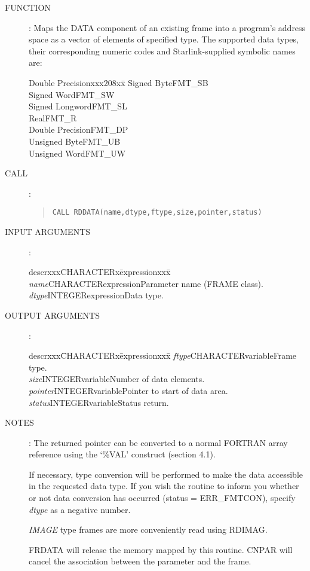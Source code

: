 \begin{description}
\item [FUNCTION]:
Maps the DATA component of an existing frame into a program's address space
as a vector of elements of specified type.
The supported data types, their corresponding numeric codes and
Starlink-supplied symbolic names are:
\begin{center}
\begin{tabbing}
Double Precisionxxx\=208xx\=\kill
Signed Byte\>FMT\_SB\\
Signed Word\>FMT\_SW\\
Signed Longword\>FMT\_SL\\
Real\>FMT\_R\\
Double Precision\>FMT\_DP\\
Unsigned Byte\>FMT\_UB\\
Unsigned Word\>FMT\_UW
\end{tabbing}
\end{center}
\item [CALL]:
\begin{quote}
{\tt CALL RDDATA(name,dtype,ftype,size,pointer,status)}
\end{quote}
\item [INPUT ARGUMENTS]:
\begin{tabbing}
descrxxx\=CHARACTERx\=expressionxxx\=\kill
{\em name}\>CHARACTER\>expression\>Parameter name (FRAME class).\\
{\em dtype}\>INTEGER\>expression\>Data type.
\end{tabbing}
\item [OUTPUT ARGUMENTS]:
\begin{tabbing}
descrxxx\=CHARACTERx\=expressionxxx\=\kill
{\em ftype}\>CHARACTER\>variable\>Frame type.\\
{\em size}\>INTEGER\>variable\>Number of data elements.\\
{\em pointer}\>INTEGER\>variable\>Pointer to start of data area.\\
{\em status}\>INTEGER\>variable\>Status return.
\end{tabbing}
\item [NOTES]:
The returned pointer can be converted to a normal FORTRAN array reference using
the `\%VAL' construct (section 4.1).

If necessary, type conversion will be performed to make the data accessible in
the requested data type.
If you wish the routine to inform you whether or not data conversion has
occurred (status = ERR\_FMTCON), specify {\em dtype} as a negative number.

{\em IMAGE} type frames are more conveniently read using RDIMAG.

FRDATA will release the memory mapped by this routine.
CNPAR will cancel the association between the parameter and the frame.
\end{description}
